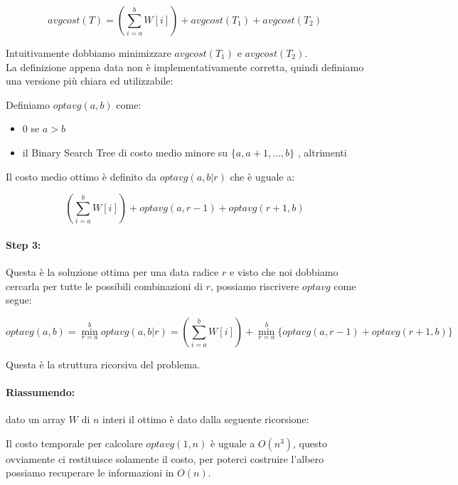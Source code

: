 \[
    avgcost(T) = (\sum_{i=a}^b W[i]) + avgcost(T_1) + avgcost(T_2)
\]

Intuitivamente dobbiamo minimizzare $avgcost(T_1)$ e $avgcost(T_2)$.\\

La definizione appena data non è implementativamente corretta, quindi definiamo
una versione più chiara ed utilizzabile:

\begin{boxed}
    Definiamo $optavg(a,b)$ come:

    \begin{itemize}[itemsep=0.5pt]
        \item $0$ se $a > b$
        \item il Binary Search Tree di costo medio minore su $\{a, a+1, \ldots, b\}$ , altrimenti
    \end{itemize}

    Il costo medio ottimo è definito da $optavg(a, b | r)$ che è uguale a:

    \[
        (\sum_{i=a}^b W[i]) + optavg(a, r-1) + optavg(r+1, b)
    \]

\end{boxed}

\paragraph{Step 3:}
Questa è la soluzione ottima per una data radice $r$ e visto che noi dobbiamo
cercarla per tutte le possibili combinazioni di $r$, possiamo riscrivere
$optavg$ come segue:

\[
    optavg(a, b) = \min_{r=a}^b optavg(a, b | r) = (\sum_{i=a}^b W[i]) +  \min_{r=a}^b \{optavg(a, r-1) + optavg(r+1, b)\}
\]

Questa è la struttura ricorsiva del problema.

\paragraph{Riassumendo:}
dato un array $W$ di $n$ interi il \binser ottimo è dato dalla seguente
ricorsione:


Il costo temporale per calcolare $optavg(1,n)$ è uguale a $O(n^3)$, questo
ovviamente ci restituisce solamente il costo, per poterci costruire l'albero
possiamo recuperare le informazioni in $O(n)$.